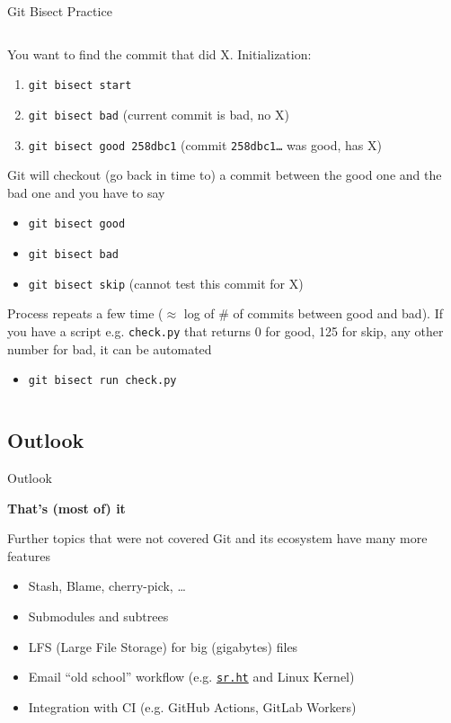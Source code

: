 \documentclass[xetex]{beamer}
\begin{document}
\begin{frame}{Git Bisect Practice}
  \begin{columns}
    \begin{column}{\linewidth}
        You want to find the commit that did X. Initialization:
        \begin{enumerate}
          \item \texttt{git bisect start}
          \item \texttt{git bisect bad} (current commit is bad, no X)
          \item \texttt{git bisect good 258dbc1} (commit \texttt{258dbc1\ldots}
            was good, has X)
        \end{enumerate}
        \pause
        Git will checkout (go back in time to) a commit between the good one
        and the bad one and you have to say
        \begin{itemize}
          \item \texttt{git bisect good}
          \item \texttt{git bisect bad}
          \item \texttt{git bisect skip} (cannot test this commit for X)
        \end{itemize}
        \pause
        Process repeats a few time ($\approx$ log of \# of commits between good
        and bad). If you have a script e.g. \texttt{check.py} that returns 0
        for good, 125 for skip, any other number for bad, it can be automated
        \begin{itemize}
          \item \texttt{git bisect run check.py}
        \end{itemize}
    \end{column}
  \end{columns}
\end{frame}

\subsection{Outlook}

\begin{frame}{Outlook}

  \centering
  {
    \Huge\bfseries
    That's (most of) it
  }
  \vspace{1cm}

  \begin{block}{Further topics that were not covered}
    Git and its ecosystem have many more features
    \begin{itemize}
      \item Stash, Blame, cherry-pick, \ldots
      \item Submodules and subtrees
      \item LFS (Large File Storage) for big (gigabytes) files 
      \item Email ``old school'' workflow (e.g. \href{https://sr.ht}{\texttt{sr.ht}} and Linux Kernel)
      \item Integration with CI (e.g. GitHub Actions, GitLab Workers)
    \end{itemize}
  \end{block}
\end{frame}
\end{document}
